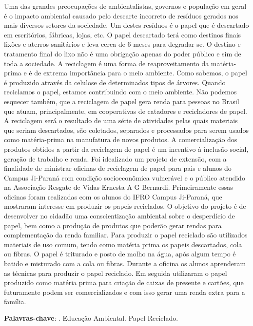 \documentclass[article,12pt,onesidea,4paper,english,brazil]{abntex2}
\begin{document}
	\noindent Uma das grandes preocupações de ambientalistas, governos e população em geral é o impacto ambiental causado pelo descarte incorreto de resíduos gerados nos mais diversos setores da sociedade. Um destes resíduos é o papel que é descartado em escritórios, fábricas, lojas, etc. O papel descartado terá como destinos finais lixões e aterros sanitários e leva cerca de 6 meses para degradar-se. O destino e tratamento final do lixo não é uma obrigação apenas do poder público e sim de toda a sociedade.  A reciclagem é uma forma de reaproveitamento da matéria-prima e é de extrema importância para o meio ambiente. Como sabemos, o papel é produzido através da celulose de determinados tipos de árvores. Quando reciclamos o papel, estamos contribuindo com o meio ambiente. Não podemos esquecer também, que a reciclagem de papel gera renda para pessoas no Brasil que atuam, principalmente, em cooperativas de catadores e recicladores de papel. A reciclagem será o resultado de uma série de atividades pelas quais materiais que seriam descartados, são coletados, separados e processados para serem usados como matéria-prima na manufatura de novos produtos. A comercialização dos produtos obtidos a partir da reciclagem de papel é um incentivo à inclusão social, geração de trabalho e renda. Foi idealizado um projeto de extensão, com a finalidade de ministrar oficinas de reciclagem de papel para pais e alunos do Campus Ji-Paraná com condição socioeconômica vulnerável e o público atendido na Associação Resgate de Vidas Ernesta A G Bernardi. Primeiramente essas oficinas foram realizadas com os alunos do IFRO Campus Ji-Paraná, que mostraram interesse em produzir os papeis reciclados. O objetivo do projeto é de desenvolver no cidadão uma conscientização ambiental sobre o desperdício de papel, bem como a produção de produtos que poderão gerar rendas para complementação da renda familiar. Para produzir o papel reciclado são utilizados materiais de uso comum, tendo como matéria prima os papeis descartados, cola ou fibras. O papel é triturado e posto de molho na água, após algum tempo é batido e misturado com a cola ou fibras. Durante a oficina os alunos aprenderam as técnicas para produzir o papel reciclado. Em seguida utilizaram o papel produzido como matéria prima para criação de caixas de presente e cartões, que futuramente podem ser comercializados e com isso gerar uma renda extra para a família.
	
	\vspace{\onelineskip}
	
	\noindent
	\textbf{Palavras-chave}: . Educação Ambiental. Papel Reciclado.
	
\end{document}
